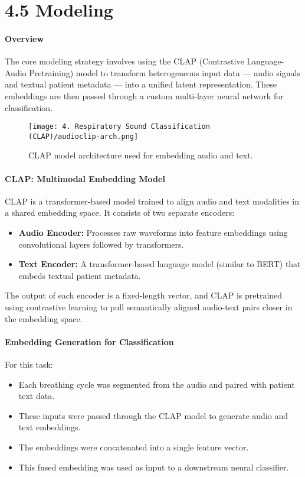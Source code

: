 \break
\section*{4.5 Modeling}

\paragraph{Overview}
The core modeling strategy involves using the CLAP (Contrastive Language-Audio Pretraining) model to transform heterogeneous input data — audio signals and textual patient metadata — into a unified latent representation. These embeddings are then passed through a custom multi-layer neural network for classification.

\begin{figure}[H]
    \centering
    \texttt{[image: 4. Respiratory Sound Classification (CLAP)/audioclip-arch.png]}
    \caption{CLAP model architecture used for embedding audio and text.}
    \label{fig:clap-model}
\end{figure}

\paragraph{CLAP: Multimodal Embedding Model}
CLAP is a transformer-based model trained to align audio and text modalities in a shared embedding space. It consists of two separate encoders:
\begin{itemize}
    \item \textbf{Audio Encoder:} Processes raw waveforms into feature embeddings using convolutional layers followed by transformers.
    \item \textbf{Text Encoder:} A transformer-based language model (similar to BERT) that embeds textual patient metadata.
\end{itemize}

The output of each encoder is a fixed-length vector, and CLAP is pretrained using contrastive learning to pull semantically aligned audio-text pairs closer in the embedding space.

\paragraph{Embedding Generation for Classification}
For this task:
\begin{itemize}
    \item Each breathing cycle was segmented from the audio and paired with patient text data.
    \item These inputs were passed through the CLAP model to generate audio and text embeddings.
    \item The embeddings were concatenated into a single feature vector.
    \item This fused embedding was used as input to a downstream neural classifier.
\end{itemize}

